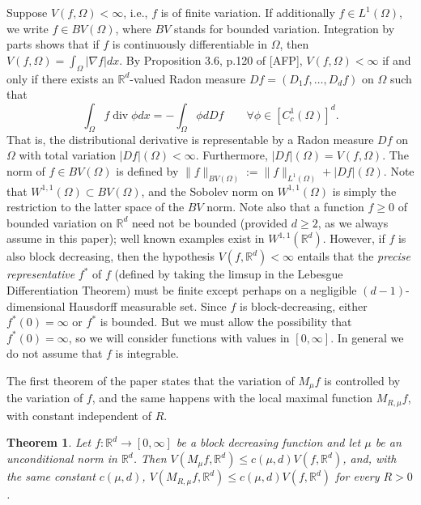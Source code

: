 \documentclass[12pt]{amsart}
\numberwithin{equation}{section}
\theoremstyle{plain}
\newtheorem{theorem}{Theorem}
\theoremstyle{definition}
\theoremstyle{remark}
\begin{document}
Suppose $V(f,\Omega) < \infty$, i.e.,
$f$ is of finite variation. If additionally $f\in L^1(\Omega)$, we write $f\in BV(\Omega)$, where $BV$
stands for bounded variation. Integration by parts shows that
if $f$ is continuously
differentiable in $\Omega$, then
$V(f,\Omega)=\int_\Omega|\nabla f|dx$. By Proposition 3.6,
p.120 of [AFP], $V(f,\Omega)<\infty$ if and only if there
exists an $\mathbb{R}^d$-valued Radon measure $Df=(D_1f,\ldots,D_df)$ on
$\Omega$ such that
\begin{equation*}
  \int_\Omega f \operatorname{div}\phi dx=-\int_\Omega \phi d
  Df \qquad \forall \phi \in [C^1_c(\Omega)]^d.
\end{equation*}
That is, the distributional derivative is representable by a
Radon measure $Df$ on $\Omega$ with
total variation
$|Df|(\Omega) < \infty$.
Furthermore, $|Df|(\Omega) = V(f,\Omega)$. The norm of
$f\in BV(\Omega)$ is defined by $\|f\|_{BV(\Omega)}:=
\|f\|_{L^1 (\Omega)} + |Df|(\Omega)$. Note that
$W^{1,1}(\Omega)\subset BV(\Omega)$, and the Sobolev norm on $W^{1,1}(\Omega)$
is simply the restriction to the latter space of the $BV$ norm.
Note also that a function $f\ge 0$ of bounded variation on
$\mathbb{R}^d$ need not
be bounded (provided $d\ge 2$, as we always assume in this paper);
 well known examples exist in $W^{1,1}(\mathbb{R}^d)$.
However, if $f$ is also block decreasing, then the hypothesis
$V(f,\mathbb{R}^d)<\infty$ entails that the {\em precise representative}
$f^*$  of $f$ (defined by taking the limsup in the Lebesgue Differentiation
Theorem)  must be finite except perhaps on a negligible $(d-1)$-dimensional
Hausdorff measurable set.  Since $f$ is block-decreasing, either $f^*(0) = \infty$ or $f^*$ is bounded.
But we must allow the possibility that $f^*(0) = \infty$,
so we will consider functions with values in $[0,\infty]$.
In general we do not assume that $f$ is integrable.

The first theorem of the paper states that the variation of $M_\mu f$
is controlled by the variation of $f$, and the same happens with the
local maximal function $M_{R,\mu} f$, with constant independent of $R$.

\begin{theorem}\label{t1}
  Let $f:\mathbb{R}^d\to [0,\infty]$ be a block decreasing function
  and let $\mu$ be an unconditional norm in $\mathbb{R}^d$. Then
 $V(M_\mu f,\mathbb{R}^d)\le c(\mu,d) V(f,\mathbb{R}^d)$, and,
with the same constant $c(\mu,d)$,
 $V(M_{R,\mu} f,\mathbb{R}^d)\le c(\mu,d) V(f,\mathbb{R}^d)$  for
  every $R > 0$.
\end{theorem}
\end{document}
